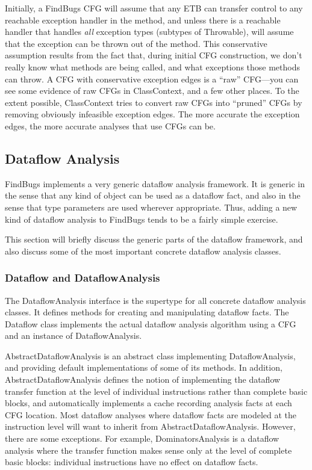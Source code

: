 \documentclass[11pt]{article}
\begin{document}
Initially, a FindBugs CFG will assume that any ETB can transfer control
to any reachable exception handler in the method,
and unless there is a reachable handler that handles {\em all}
exception types (subtypes of Throwable), will assume that the exception
can be thrown out of the method.
This conservative assumption results
from the fact that, during initial CFG construction, we don't really know what
methods are being called, and what exceptions those methods can throw.
A CFG with conservative exception edges is a ``raw'' CFG---you can see
some evidence of raw CFGs in ClassContext, and a few other places.
To the extent possible, ClassContext tries to convert raw CFGs into 
``pruned'' CFGs by removing obviously infeasible exception edges.
The more accurate the exception edges, the more accurate analyses that
use CFGs can be.

\subsection{Dataflow Analysis}

FindBugs implements a very generic dataflow analysis framework.
It is generic in the sense that any kind of object can be used as
a dataflow fact, and also in the sense that type parameters are used
wherever appropriate.  Thus, adding a new kind of dataflow analysis
to FindBugs tends to be a fairly simple exercise.

This section will briefly discuss the generic parts of the dataflow framework,
and also discuss some of the most important concrete dataflow analysis
classes.

\subsubsection{Dataflow and DataflowAnalysis}

The DataflowAnalysis interface is the supertype for all concrete dataflow
analysis classes.  It defines methods for creating and manipulating dataflow
facts.  The Dataflow class implements the actual dataflow analysis algorithm
using a CFG and an instance of DataflowAnalysis.

AbstractDataflowAnalysis is an abstract class implementing DataflowAnalysis,
and providing default implementations of some of its methods.  In addition,
AbstractDataflowAnalysis defines the notion of implementing the dataflow transfer
function at the level of individual instructions rather than complete basic
blocks, and automatically implements a cache recording analysis facts at each
CFG location.  Most dataflow analyses 
where dataflow facts are modeled at the instruction level
will want to inherit from
AbstractDataflowAnalysis.  However, there are some exceptions.
For example, DominatorsAnalysis is a dataflow analysis where the transfer
function makes sense only at the level of complete basic blocks:
individual instructions have no effect on dataflow facts.
\end{document}

